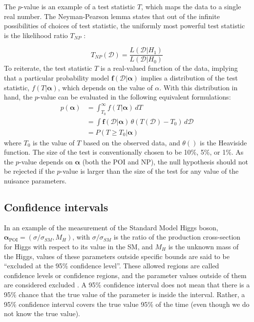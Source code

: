 The $p$-value is an example of a test statistic $T$, which maps the data to a single real number. The Neyman-Pearson lemma states that out of the infinite possibilities of choices of test statistic, the uniformly most powerful test statistic is the likelihood ratio $T_{NP}$ \cite{2011-Statistics-Cranmer}:

\begin{equation}
    T_{NP}(\mathcal{D}) = \frac{L(\mathcal{D} | {H_1})}{L(\mathcal{D}|{H_0})}
\end{equation}
To reiterate, the test statistic $T$ is a real-valued function of the data, implying that a particular probability model $\boldsymbol{f}(\mathcal{D}|\boldsymbol{\alpha})$ implies a distribution of the test statistic, $f(T|\boldsymbol{\alpha})$, which depends on the value of $\alpha$. With this distribution in hand, the $p$-value can be evaluated in the following equivalent formulations:
\begin{align}
    p(\boldsymbol{\alpha}) &= \int_{T_0}^{\infty} f(T|\boldsymbol{\alpha}) \, dT  \\
              &= \int \boldsymbol{f}(\mathcal{D} | \boldsymbol{\alpha}) \, \theta(T(\mathcal{D}) - T_0) \, d\mathcal{D} \\
              &= P(T \geq T_0 | \boldsymbol{\alpha})
\end{align}
where $T_0$ is the value of $T$ based on the observed data, and $\theta()$ is the Heaviside function. The size of the test is conventionally chosen to be 10\%, 5\%, or 1\%. As the $p$-value depends on $\boldsymbol{\alpha}$ (both the POI and NP), the null hypothesis should not be rejected if the $p$-value is larger than the size of the test for any value of the nuisance parameters.

\subsection{Confidence intervals}
In an example of the measurement of the Standard Model Higgs boson, $\boldsymbol{\alpha}_{\text{POI}} = (\sigma/ \sigma_{SM}, M_H)$, with $\sigma/\sigma_{SM}$ is the ratio of the production cross-section for Higgs with respect to its value in the SM, and $M_H$ is the unknown mass of the Higgs, values of these parameters outside specific bounds are said to be ``excluded at the 95\% confidence level''. These allowed regions are called confidence levels or confidence regions, and the parameter values outside of them are considered excluded \cite{2011-Statistics-Cranmer}. A 95\% confidence interval does not mean that there is a 95\% chance that the true value of the parameter is inside the interval. Rather, a 95\% confidence interval covers the true value 95\% of the time (even though we do not know the true value). 

